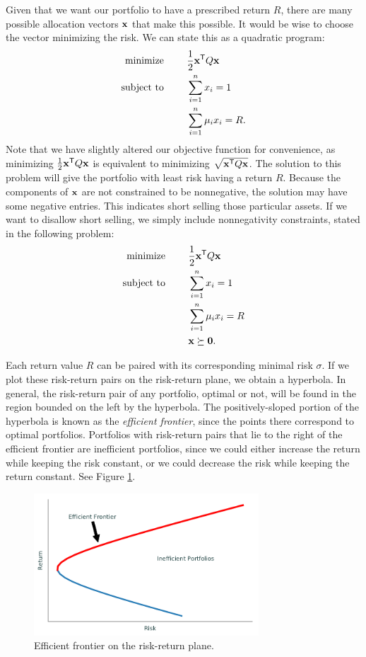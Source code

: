 Given that we want our portfolio to have a prescribed return $R$, there are many possible allocation vectors $\mathbf{x}$ that make this possible.
It would be wise to choose the vector minimizing the risk.
We can state this as a quadratic program:
\begin{align*}
\text{minimize }\qquad &\frac{1}{2}\mathbf{x}^{\mathsf T} Q\mathbf{x}\\
\text{subject to }\qquad &\sum_{i=1}^n x_i = 1\\
&\sum_{i=1}^n \mu_ix_i = R.\\
\end{align*}
Note that we have slightly altered our objective function for convenience, as minimizing $\frac{1}{2}\mathbf{x}^{\mathsf T} Q\mathbf{x}$ is equivalent to minimizing $\sqrt{\mathbf{x}^{\mathsf T} Q\mathbf{x}}$.
The solution to this problem will give the portfolio with least risk having a return $R$.
Because the components of $\mathbf{x}$ are not constrained to be nonnegative, the solution may have some negative entries.
This indicates short selling those particular assets.
If we want to disallow short selling, we simply include nonnegativity constraints, stated in the following problem:
\begin{align*}
\text{minimize }\qquad &\frac{1}{2}\mathbf{x}^{\mathsf T} Q\mathbf{x}\\
\text{subject to }\qquad &\sum_{i=1}^n x_i = 1\\
&\sum_{i=1}^n \mu_ix_i = R\\
&\mathbf{x} \succeq \mathbf{0}.
\end{align*}

Each return value $R$ can be paired with its corresponding minimal risk $\sigma$.
If we plot these risk-return pairs on the risk-return plane, we obtain a hyperbola.
In general, the risk-return pair of any portfolio, optimal or not, will be found in the region bounded on the left by the hyperbola.
The positively-sloped portion of the hyperbola is known as the
\emph{efficient frontier}, since the points there correspond to optimal portfolios.
Portfolios with risk-return pairs that lie to the right of the efficient frontier are inefficient portfolios, since we could either increase the return while keeping the risk constant, or we could decrease the risk while keeping the return constant.
See Figure \ref{fig:frontier}.

\begin{figure}[H]
\includegraphics[width=0.75\textwidth]{figures/frontier.pdf}
\caption{Efficient frontier on the risk-return plane.}
\label{fig:frontier}
\end{figure}


